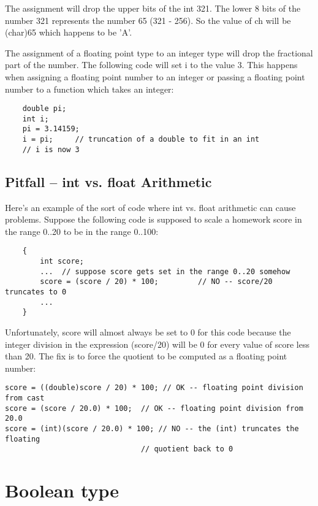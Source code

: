 The assignment will drop the upper bits of the int 321. The lower 8 bits of the number 321 represents the number 65 (321 - 256). So the value of ch will be (char)65 which happens to be 'A'.

The assignment of a floating point type to an integer type will drop the fractional part of the number. The following code will set i to the value 3. This happens when assigning a floating point number to an integer or passing a floating point number to a function which takes an integer:

\begin{lstlisting}
    double pi;
    int i;
    pi = 3.14159;
    i = pi;     // truncation of a double to fit in an int
    // i is now 3
\end{lstlisting}

\subsection{Pitfall -- int vs. float Arithmetic}

Here's an example of the sort of code where int vs. float arithmetic can cause problems. Suppose the following code is supposed to scale a homework score in the range 0..20 to be in the range 0..100:

\begin{lstlisting}
    {
        int score;
        ...  // suppose score gets set in the range 0..20 somehow
        score = (score / 20) * 100;         // NO -- score/20 truncates to 0
        ...
    }
\end{lstlisting}


Unfortunately, score will almost always be set to 0 for this code because the integer division in the expression (score/20) will be 0 for every value of score less than 20. The fix is to force the quotient to be computed as a floating point number:

\begin{lstlisting}
score = ((double)score / 20) * 100; // OK -- floating point division from cast
score = (score / 20.0) * 100;  // OK -- floating point division from 20.0
score = (int)(score / 20.0) * 100; // NO -- the (int) truncates the floating
                               // quotient back to 0
\end{lstlisting}

\section{Boolean type}


